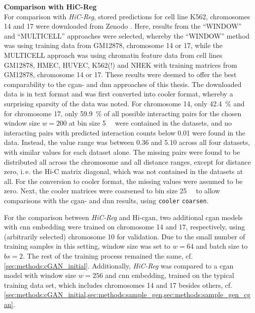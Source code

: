\textbf{Comparison with HiC-Reg}\\
For comparison with \emph{HiC-Reg}, stored predictions for cell line K562, chromosomes 14 and 17 were downloaded from Zenodo \cite{ShiluZhang2019,ShiluZhang2019a}.
Here, results from the ``WINDOW'' and ``MULTICELL'' approaches were selected, whereby the ``WINDOW'' method was using training data from GM12878, chromosome 14 or 17, 
while the MULTICELL approach was using chromatin feature data from cell lines GM12878, HMEC, HUVEC, K562(!) and NHEK with training matrices from GM12878, chromosome 14 or 17.
These results were deemed to offer the best comparability to the \acrshort{cgan}- and \acrshort{dnn} approaches of this thesis.
The downloaded data is in text format and was first converted into cooler format, whereby a surprising sparsity of the data was noted.
For chromosome 14, only \SI{42.4}{\percent} and for chromosome 17, only \SI{59.9}{\percent} of all possible interacting pairs 
for the chosen window size $w=200$ at bin size \SI{5}{\kilo\bp} were contained in the datasets, 
and no interacting pairs with predicted interaction counts below 0.01 were found in the data. 
Instead, the value range was between 0.36 and 5.10 across all four datasets, with similar values for each dataset alone.
The missing pairs were found to be distributed all across the chromosome and all distance ranges, except for distance zero, i.\,e. the Hi-C matrix diagonal, which was not contained in the datasets at all.
For the conversion to cooler format, the missing values were assumed to be zero.
Next, the cooler matrices were coarsened to bin size \SI{25}{\kilo\bp} to allow comparisons with the \acrshort{cgan}- and \acrshort{dnn} results, using \texttt{cooler} \texttt{coarsen}.

For the comparison between \emph{HiC-Reg} and Hi-\acrshort{cgan}, two additional \acrshort{cgan} models with \acrshort{cnn} embedding were trained on chromosome 14 and 17, respectively,
using (arbitrarily selected) chromosome 10 for validation. 
Due to the small number of training samples in this setting, window size was set to $w=64$ and batch size to $bs=2$.
The rest of the training process remained the same, cf. \cref{sec:methods:cGAN_initial}.
Additionally, \emph{HiC-Reg} was compared to a \acrshort{cgan} model with window size $w=256$ and \acrshort{cnn} embedding, trained on the typical training data set, 
which includes chromosomes 14 and 17 besides others, cf. \cref{sec:methods:cGAN_initial,sec:methods:sample_gen,sec:methods:sample_gen_cgan}.


